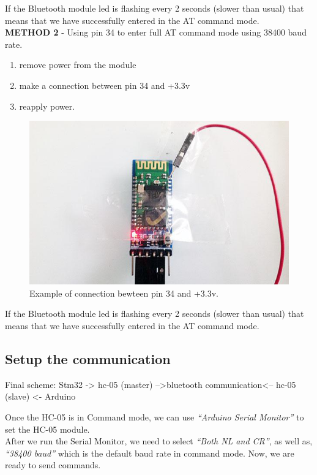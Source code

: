 If the Bluetooth module led is flashing every 2 seconds (slower than usual) that means that we have successfully entered in the AT command mode.\\
\textbf{METHOD 2} - Using pin 34 to enter full AT command mode using 38400 baud rate.
\begin{enumerate}
	\item remove power from the module
	\item make a connection between pin 34 and +3.3v
	\item reapply power.
\end{enumerate}
\begin{figure}[H]
	\centering
	\includegraphics[width=\textwidth]
	{files/images/hc05_pin34}
	\caption{Example of connection bewteen pin 34 and +3.3v.}
\end{figure}
If the Bluetooth module led is flashing every 2 seconds (slower than usual) that means that we have successfully entered in the AT command mode.

\subsection{Setup the communication}
Final scheme:
Stm32 -> hc-05 (master)    -->bluetooth communication<--    hc-05 (slave) <- Arduino

Once the HC-05 is in Command mode, we can use \textit{“Arduino Serial Monitor”} to set the HC-05 module.\\
After we run the Serial Monitor, we need to select \textit{“Both NL and CR”}, as well as, \textit{“38400 baud”} which is the default baud rate in command mode. Now, we are ready to send commands.\\

